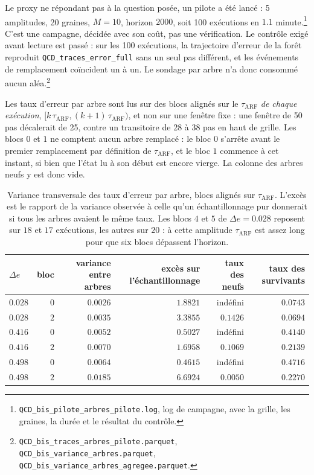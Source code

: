 \documentclass[11pt,a4paper]{article}
\begin{document}
Le proxy ne répondant pas à la question posée, un pilote a été lancé : 5 amplitudes,
20 graines, $M = 10$, horizon $2000$, soit 100 exécutions en $1.1$
minute.\footnote{\texttt{QCD\_bis\_pilote\_arbres\_pilote.log}, log de campagne, avec la
grille, les graines, la durée et le résultat du contrôle.} C'est une campagne, décidée avec
son coût, pas une vérification. Le contrôle exigé avant lecture est passé : sur les 100
exécutions, la trajectoire d'erreur de la forêt reproduit \texttt{QCD\_traces\_error\_full}
sans un seul pas différent, et les événements de remplacement coïncident un à un. Le sondage
par arbre n'a donc consommé aucun
aléa.\footnote{\texttt{QCD\_bis\_traces\_arbres\_pilote.parquet},
\texttt{QCD\_bis\_variance\_arbres.parquet},
\texttt{QCD\_bis\_variance\_arbres\_agregee.parquet}.}

Les taux d'erreur par arbre sont lus sur des blocs alignés sur le $\tau_{\mathrm{ARF}}$
\emph{de chaque exécution}, $[k\,\tau_{\mathrm{ARF}}, (k+1)\,\tau_{\mathrm{ARF}})$, et non sur
une fenêtre fixe : une fenêtre de 50 pas décalerait de 25, contre un transitoire de 28 à 38
pas en haut de grille. Les blocs $0$ et $1$ ne comptent aucun arbre remplacé : le bloc $0$
s'arrête avant le premier remplacement par définition de $\tau_{\mathrm{ARF}}$, et le bloc $1$
commence à cet instant, si bien que l'état lu à son début est encore vierge. La colonne des
arbres neufs y est donc vide.

\begin{table}[htbp]
  \centering
  \begin{tabular}{lrrrrr}
    \toprule
    $\Delta e$ & bloc & variance entre arbres & excès sur l'échantillonnage
    & taux des neufs & taux des survivants \\
    \midrule
    $0.028$ & $0$ & $0.0026$ & $1.8821$ & indéfini & $0.0743$ \\
    $0.028$ & $2$ & $0.0035$ & $3.3855$ & $0.1426$ & $0.0694$ \\
    $0.416$ & $0$ & $0.0052$ & $0.5027$ & indéfini & $0.4140$ \\
    $0.416$ & $2$ & $0.0070$ & $1.6958$ & $0.1069$ & $0.2139$ \\
    $0.498$ & $0$ & $0.0064$ & $0.4615$ & indéfini & $0.4716$ \\
    $0.498$ & $2$ & $0.0185$ & $6.6924$ & $0.0050$ & $0.2270$ \\
    \bottomrule
  \end{tabular}
  \caption{Variance transversale des taux d'erreur par arbre, blocs alignés sur
  $\tau_{\mathrm{ARF}}$. L'excès est le rapport de la variance observée à celle qu'un
  échantillonnage pur donnerait si tous les arbres avaient le même taux. Les blocs $4$ et $5$
  de $\Delta e = 0.028$ reposent sur $18$ et $17$ exécutions, les autres sur $20$ : à cette
  amplitude $\tau_{\mathrm{ARF}}$ est assez long pour que six blocs dépassent l'horizon.}
\end{table}
\end{document}
